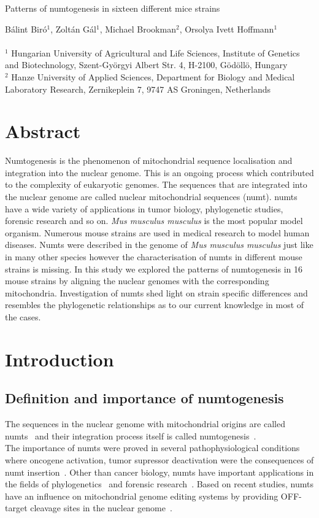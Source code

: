 \documentclass[a4paper,12pt]{article}
\numberwithin{equation}{section} %
\begin{document}
\begin{center}
	\Large{Patterns of numtogenesis in sixteen different mice strains}
\end{center}
\small{Bálint Biró$^1$, Zoltán Gál$^1$, Michael Brookman$^2$, Orsolya Ivett Hoffmann$^1$}\\ \\
\scriptsize{$^1$ Hungarian University of Agricultural and Life Sciences, Institute of Genetics and Biotechnology, Szent-Györgyi Albert Str. 4, H-2100, Gödöllö, Hungary\\
$^2$ Hanze University of Applied Sciences, Department for Biology and Medical Laboratory Research, Zernikeplein 7, 9747 AS Groningen, Netherlands}

\normalsize
\section{Abstract}
\indent Numtogenesis is the phenomenon of mitochondrial sequence localisation and integration into the nuclear genome. This is an ongoing process which contributed to the complexity of eukaryotic genomes. The sequences that are integrated into the nuclear genome are called nuclear mitochondrial sequences (numt). numts have a wide variety of applications in tumor biology, phylogenetic studies, forensic research and so on. \textit{Mus musculus musculus} is the most popular model organism. Numerous mouse strains are used in medical research to model human diseases. Numts were described in the genome of  \textit{Mus musculus musculus} just like in many other species however the characterisation of  numts in different mouse strains is missing. In this study we explored the patterns of numtogenesis in 16 mouse strains by aligning the nuclear genomes with the corresponding mitochondria. Investigation of numts shed light on strain specific differences and resembles the phylogenetic relationships as to our current knowledge in most of the cases.
\section{Introduction}
\subsection{Definition and importance of numtogenesis}
\indent The sequences in the nuclear genome with mitochondrial origins are called numts~ and their integration process itself is called numtogenesis~. \\ \indent The importance of numts were proved in several pathophysiological conditions where oncogene activation, tumor supressor deactivation were the consequences of numt insertion~. Other than cancer biology, numts have important applications in the fields of phylogenetics~ and forensic research~. Based on recent studies, numts have an influence on mitochondrial genome editing systems by providing OFF-target cleavage sites in the nuclear genome~.
\end{document}

